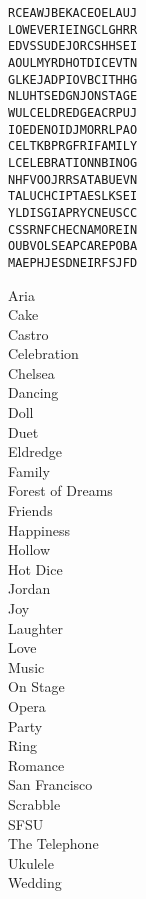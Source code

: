 \begin{spacing}{1.2}
\begin{alltt}
\begin{center}
R C E A W J B E K A C E O E L A U J
L O W E V E R I E I N G C L G H R R
E D V S S U D E J O R C S H H S E I
A O U L M Y R D H O T D I C E V T N
G L K E J A D P I O V B C I T H H G
N L U H T S E D G N J O N S T A G E
W U L C E L D R E D G E A C R P U J
I O E D E N O I D J M O R R L P A O
C E L T K B P R G F R I F A M I L Y
L C E L E B R A T I O N N B I N O G
N H F V O O J R R S A T A B U E V N
T A L U C H C I P T A E S L K S E I
Y L D I S G I A P R Y C N E U S C C
C S S R N F C H E C N A M O R E I N
O U B V O L S E A P C A R E P O B A
M A E P H J E S D N E I R F S J F D
\end{center}
\end{alltt}
\end{spacing}
\begin{multicols}{3}
\noindent
Aria \\
Cake \\
Castro \\
Celebration \\
Chelsea \\
Dancing \\
Doll \\
Duet \\
Eldredge \\
Family \\
Forest of Dreams \\
Friends \\
Happiness \\
Hollow \\
Hot Dice \\
Jordan \\
Joy \\
Laughter \\
Love \\
Music \\
On Stage \\
Opera \\
Party \\
Ring \\
Romance \\
San Francisco \\
Scrabble \\
SFSU \\
The Telephone \\
Ukulele \\
Wedding \\
\end{multicols}
